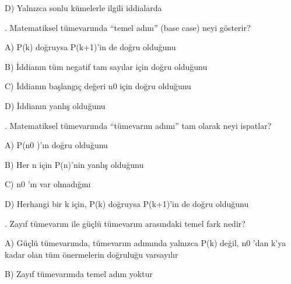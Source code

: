 \par\noindent\hspace*{1.6em}D) Yalnızca sonlu kümelerle ilgili iddialarda

\par\smallskip{}. Matematiksel tümevarımda “temel adım” (base case) neyi gösterir?

\par\noindent\hspace*{1.6em}A) P(k) doğruysa P(k+1)’in de doğru olduğunu

\par\noindent\hspace*{1.6em}B) İddianın tüm negatif tam sayılar için doğru olduğunu

\par\noindent\hspace*{1.6em}C) İddianın başlangıç değeri n0 için doğru olduğunu

\par\noindent\hspace*{1.6em}D) İddianın yanlış olduğunu

\par\smallskip{}. Matematiksel tümevarımda “tümevarım adımı” tam olarak neyi ispatlar?

\par\noindent\hspace*{1.6em}A) P(n0 )’ın doğru olduğunu

\par\noindent\hspace*{1.6em}B) Her n için P(n)’nin yanlış olduğunu

\par\noindent\hspace*{1.6em}C) n0 ’ın var olmadığını

\par\noindent\hspace*{1.6em}D) Herhangi bir k için, P(k) doğruysa P(k+1)’in de doğru olduğunu

\par\smallskip{}. Zayıf tümevarım ile güçlü tümevarım arasındaki temel fark nedir?

\par\noindent\hspace*{1.6em}A) Güçlü tümevarımda, tümevarım adımında yalnızca P(k) değil, n0 ’dan k’ya kadar olan tüm önermelerin doğruluğu varsayılır

\par\noindent\hspace*{1.6em}B) Zayıf tümevarımda temel adım yoktur

